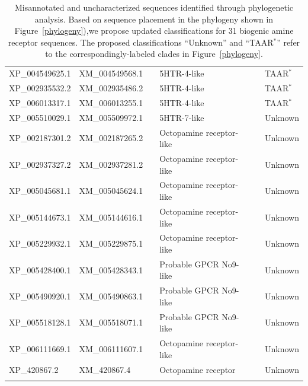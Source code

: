 \documentclass[fleqn,10pt]{wlpeerj}
\begin{document}
\begin{table}[htbp]
\begin{tabular}{l l l l l l}
		XP\_004549625.1 & XM\_004549568.1 & \qquad \qquad & 5HTR-4-like & \qquad \qquad & TAAR$^\ast$ \\
		XP\_002935532.2 & XM\_002935486.2 & \qquad \qquad & 5HTR-4-like & \qquad \qquad & TAAR$^\ast$ \\
		XP\_006013317.1 & XM\_006013255.1 & \qquad \qquad & 5HTR-4-like & \qquad \qquad & TAAR$^\ast$ \\	
		XP\_005510029.1 & XM\_005509972.1 & \qquad \qquad & 5HTR-7-like & \qquad \qquad & Unknown \\
		XP\_002187301.2 & XM\_002187265.2 & \qquad \qquad & Octopamine receptor-like & \qquad \qquad & Unknown \\
		XP\_002937327.2 & XM\_002937281.2 & \qquad \qquad & Octopamine receptor-like & \qquad \qquad & Unknown \\
		XP\_005045681.1 & XM\_005045624.1 & \qquad \qquad & Octopamine receptor-like & \qquad \qquad & Unknown \\
		XP\_005144673.1 & XM\_005144616.1 & \qquad \qquad & Octopamine receptor-like & \qquad \qquad & Unknown \\
		XP\_005229932.1 & XM\_005229875.1 & \qquad \qquad & Octopamine receptor-like & \qquad \qquad & Unknown \\
		XP\_005428400.1 & XM\_005428343.1 & \qquad \qquad & Probable GPCR No9-like & \qquad \qquad & Unknown \\
		XP\_005490920.1 & XM\_005490863.1 & \qquad \qquad & Probable GPCR No9-like & \qquad \qquad & Unknown \\
		XP\_005518128.1 & XM\_005518071.1 & \qquad \qquad & Probable GPCR No9-like & \qquad \qquad & Unknown \\
		XP\_006111669.1 & XM\_006111607.1 & \qquad \qquad & Octopamine receptor-like & \qquad \qquad & Unknown \\
		XP\_420867.2 & XM\_420867.4 & \qquad \qquad & Octopamine receptor & \qquad \qquad & Unknown \\
		\noalign{\smallskip}\hline\noalign{\smallskip} 
	\end{tabular}
	\caption{\label{tab:classif} Misannotated and uncharacterized sequences identified through phylogenetic analysis. Based on sequence placement in the phylogeny shown in Figure~\ref{phylogeny}),we propose updated classifications for 31 biogenic amine receptor sequences. The proposed classifications ``Unknown'' and ``TAAR$^\ast$'' refer to the correspondingly-labeled clades in Figure~\ref{phylogeny}.}
\end{table}
\end{document}
